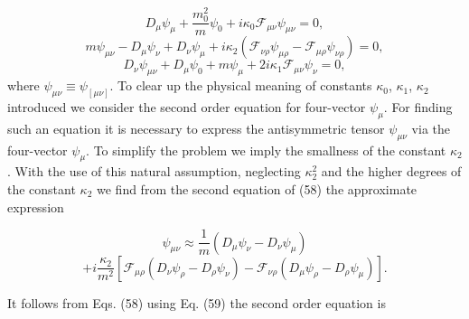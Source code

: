 \documentclass[a4paper,12pt]{article}
\begin{document}
\[
D_\mu \psi_\mu +\frac{m_0^2}{m}\psi_0+i\kappa
_0\mathcal{F}_{\mu\nu}\psi_{\mu\nu}=0,
\]
\begin{equation}
m\psi_{\mu \nu }-D_\mu \psi_\nu +D_\nu
\psi_\mu+i\kappa_2\left(\mathcal{F}_{\nu\rho}\psi_{\mu\rho}-
\mathcal{F}_{\mu\rho}\psi_{\nu\rho}\right)=0, \label{58}
\end{equation}
\[
D_\nu \psi_{\mu \nu }+D_\mu \psi_0+m \psi_\mu
+2i\kappa_1\mathcal{F}_{\mu\nu}\psi_\nu=0,
\]
where $\psi_{\mu \nu }\equiv\psi_{[\mu \nu ]}$. To clear up the
physical meaning of constants $\kappa_0$, $\kappa_1$, $\kappa_2$
introduced we consider the second order equation for four-vector
$\psi_\mu$. For finding such an equation it is necessary to
express the antisymmetric tensor $\psi_{\mu\nu}$ via the
four-vector $\psi_\mu$. To simplify the problem we imply the
smallness of the constant $\kappa_2$. With the use of this natural
assumption, neglecting $\kappa^2_2$ and the higher degrees of the
constant $\kappa_2$ we find from the second equation of (58) the
approximate expression

\[
\psi_{\mu \nu }\approx\frac1m \left(D_\mu \psi_\nu -D_\nu
\psi_\mu\right)
\]
\vspace{-8mm}
\begin{equation}
\label{59}
\end{equation}
\vspace{-8mm}
\[
+i\frac{\kappa_2}{m^2}\left[\mathcal{F}_{\mu\rho}\left(D_\nu\psi_\rho-
D_\rho\psi_\nu\right)-\mathcal{F}_{\nu\rho}\left(D_\mu\psi_\rho-
D_\rho\psi_\mu\right)\right].
\]

It follows from Eqs. (58) using Eq. (59) the second order equation
is
\end{document}
